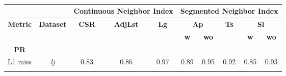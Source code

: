 \begin{table}[h!]
\caption{}
\small
\begin{tabular}{|ccccc|ccccc|}
\hline
\multicolumn{2}{|c|}{}                                                                                             & \multicolumn{3}{c|}{\textbf{Continuous Neighbor Index}}                                                                                   & \multicolumn{5}{c|}{\textbf{Segmented Neighbor Index}}                                                                                                                 \\ \hline
\multicolumn{1}{|c|}{\multirow{2}{*}{\textbf{Metric}}}    & \multicolumn{1}{c|}{\multirow{2}{*}{\textbf{Dataset}}} & \multicolumn{1}{c|}{\multirow{2}{*}{\textbf{CSR}}} & \multicolumn{1}{c|}{\multirow{2}{*}{\textbf{AdjLst}}} & \multirow{2}{*}{\textbf{Lg}} & \multicolumn{2}{c|}{\textbf{Ap}}                                   & \multicolumn{1}{c|}{\multirow{2}{*}{\textbf{Ts}}} & \multicolumn{2}{c|}{\textbf{Sl}}              \\ \cline{6-7} \cline{9-10} 
\multicolumn{1}{|c|}{}                                    & \multicolumn{1}{c|}{}                                  & \multicolumn{1}{c|}{}                              & \multicolumn{1}{c|}{}                                 &                              & \multicolumn{1}{c|}{\textbf{w}} & \multicolumn{1}{c|}{\textbf{wo}} & \multicolumn{1}{c|}{}                             & \multicolumn{1}{c|}{\textbf{w}} & \textbf{wo} \\ \hline
\multicolumn{1}{|c|}{\textbf{PR}}                         &                                                        &                                                    &                                                       &                              &                                 &                                  &                                                   &                                 &             \\ \hline
\multicolumn{1}{|c|}{\multirow{2}{*}{L1 miss}}            & \multicolumn{1}{c|}{\emph{lj}}            & \multicolumn{1}{c|}{0.83}                          & \multicolumn{1}{c|}{0.86}                             & 0.97                         & \multicolumn{1}{c|}{0.89}       & \multicolumn{1}{c|}{0.95}        & \multicolumn{1}{c|}{0.92}                         & \multicolumn{1}{c|}{0.85}       & 0.93        \\ \cline{2-10} 

\end{tabular}
\end{table}
